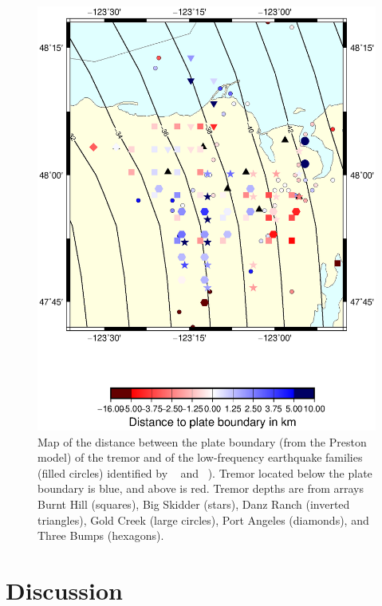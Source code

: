 \documentclass[draft]{agujournal2019}
\begin{document}
\begin{figure}
\noindent\includegraphics[width=\textwidth, trim={1cm 5cm 3.5cm 4cm},clip]{figures/d_to_pb_PWS_PWS_P.eps}
\caption{Map of the distance between the plate boundary (from the Preston model) of the tremor and of the low-frequency earthquake families (filled circles) identified by ~ and ~). Tremor located below the plate boundary is blue, and above is red. Tremor depths are from arrays Burnt Hill (squares), Big Skidder (stars), Danz Ranch (inverted triangles),  Gold Creek (large circles), Port Angeles (diamonds), and Three Bumps (hexagons).}
\label{pngfiguresample}
\end{figure}

\section{Discussion}
\end{document}
